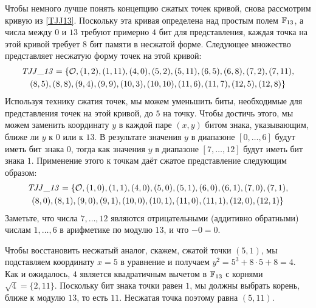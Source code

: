 \begin{example} Чтобы немного лучше понять концепцию сжатых точек кривой, снова рассмотрим кривую \TJJ{} из \examplename{} \ref{TJJ13}. Поскольку эта кривая определена над простым полем $\mathbb{F}_{13}$, а числа между $0$ и $13$ требуют примерно $4$ бит для представления, каждая точка \TJJ{} на этой кривой требует $8$ бит памяти в несжатой форме. Следующее множество представляет несжатую форму точек на этой кривой:
\begin{multline}
\mathit{TJJ\_13} = \{\mathcal{O}, (1, 2), (1, 11), (4, 0), (5, 2), (5, 11), (6, 5), (6, 8), (7,2), (7, 11), \\ (8, 5), (8, 8), (9, 4), (9, 9), (10, 3), (10,
10), (11, 6), (11, 7), (12, 5), (12, 8)\}
\end{multline}
Используя технику сжатия точек, мы можем уменьшить биты, необходимые для представления точек на этой кривой, до $5$ на точку. Чтобы достичь этого, мы можем заменить координату $y$ в каждой паре $(x,y)$ битом знака, указывающим, ближе ли $y$ к $0$ или к $13$. В результате значения $y$ в диапазоне $[0,\ldots,6]$ будут иметь бит знака $0$, тогда как значения $y$ в диапазоне $[7,\ldots,12]$ будут иметь бит знака $1$. Применение этого к точкам \TJJ{} даёт сжатое представление следующим образом:
\begin{multline}
\mathit{TJJ\_13} = \{\mathcal{O}, (1, 0), (1, 1), (4, 0), (5, 0), (5, 1), (6, 0), (6, 1), (7,0), (7, 1), \\ (8, 0), (8, 1), (9, 0), (9, 1), (10, 0), (10,1), (11, 0), (11, 1), (12, 0), (12, 1)\}
\end{multline} 
Заметьте, что числа $7,\ldots, 12$ являются отрицательными (аддитивно обратными) числам $1,\ldots, 6$ в арифметике по модулю $13$, и что $-0=0$.

Чтобы восстановить несжатый аналог, скажем, сжатой точки $(5,1)$, мы подставляем координату $x=5$ в уравнение  и получаем $y^2 = 5^3 + 8\cdot 5 +8 = 4$. Как и ожидалось, $4$ является квадратичным вычетом в $\mathbb{F}_{13}$ с корнями $\sqrt{4}= \{2,11\}$. Поскольку бит знака точки равен $1$, мы должны выбрать корень, ближе к модулю $13$, то есть $11$. Несжатая точка поэтому равна $(5,11)$. 
\end{example}
